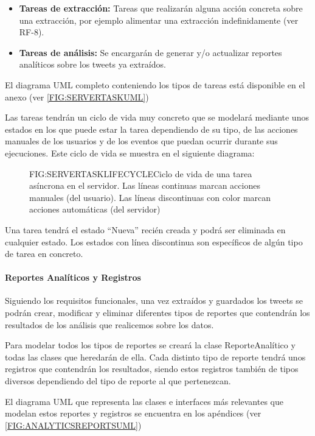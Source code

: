 \begin{itemize}
	\item \textbf{Tareas de extracción:} Tareas que realizarán alguna acción concreta sobre una extracción, por ejemplo alimentar una extracción indefinidamente (ver RF-8).
	\item \textbf{Tareas de análisis:} Se encargarán de generar y/o actualizar reportes analíticos sobre los tweets ya extraídos.
\end{itemize}

El diagrama UML completo conteniendo los tipos de tareas está disponible en el anexo (ver \ref{FIG:SERVERTASKUML}) 

Las tareas tendrán un ciclo de vida muy concreto que se modelará mediante unos estados en los que puede estar la tarea dependiendo de su tipo, de las acciones manuales de los usuarios y de los eventos que puedan ocurrir durante sus ejecuciones.
Este ciclo de vida se muestra en el siguiente diagrama:

\begin{figure}[Ciclo de vida de una tarea asíncrona]{FIG:SERVERTASKLIFECYCLE}{Ciclo de vida de una tarea asíncrona en el servidor. Las líneas continuas marcan acciones manuales (del usuario). Las líneas discontinuas con color marcan acciones automáticas (del servidor)}
\end{figure}
Una tarea tendrá el estado ``Nueva'' recién creada y podrá ser eliminada en cualquier estado. Los estados con línea discontinua son específicos de algún tipo de tarea en concreto.

\paragraph{Reportes Analíticos y Registros}
Siguiendo los requisitos funcionales, una vez extraídos y guardados los tweets se podrán crear, modificar y eliminar diferentes tipos de reportes que contendrán los resultados de los análisis que realicemos sobre los datos.

Para modelar todos los tipos de reportes se creará la clase ReporteAnalítico y todas las clases que heredarán de ella.
Cada distinto tipo de reporte tendrá unos registros que contendrán los resultados, siendo estos registros también de tipos diversos dependiendo del tipo de reporte al que pertenezcan.

El diagrama UML que representa las clases e interfaces más relevantes que modelan estos reportes y registros se encuentra en los apéndices (ver \ref{FIG:ANALYTICSREPORTSUML})
